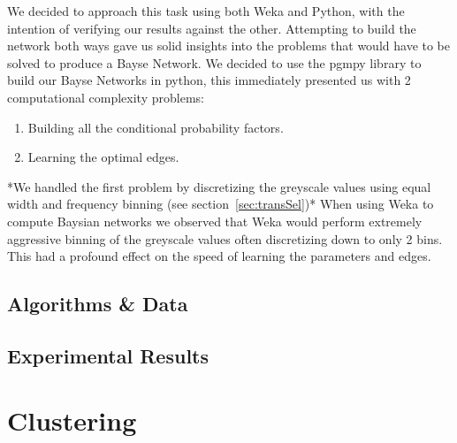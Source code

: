\documentclass[11pt]{article}
\begin{document}
We decided to approach this task using both Weka and Python, with the intention of verifying our results against the other.
Attempting to build the network both ways gave us solid insights into the problems that would have to be solved to produce a Bayse Network.
We decided to use the pgmpy library to build our Bayse Networks in python, this immediately presented us with 2 computational complexity problems:
\begin{enumerate}
    \item Building all the conditional probability factors.
    \item Learning the optimal edges.
\end{enumerate}

*We handled the first problem by discretizing the greyscale values using equal width and frequency binning (see section~\ref{sec:transSel})*
When using Weka to compute Baysian networks we observed that Weka would perform extremely aggressive binning of the greyscale values often discretizing down to only 2 bins. This had a profound effect on the speed of learning the parameters and edges.

\subsection{Algorithms \& Data}





\subsection{Experimental Results}


\pagebreak

\section{Clustering}
\end{document}

